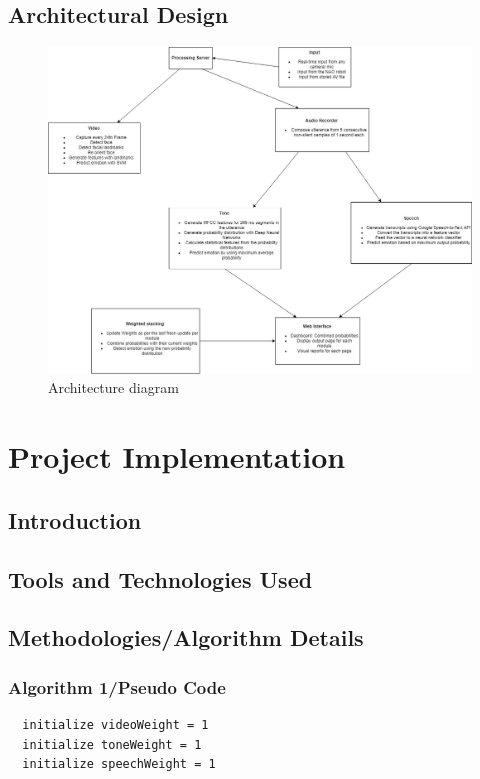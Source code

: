 \documentclass[oneside,a4paper,12pt]{report}
\begin{document}
\begin{normalsize}
\section{Architectural Design}  
 
\begin{center}
	\begin{figure}[!htbp]
		\centering
		\includegraphics[width=\textwidth]{arch.jpg}
	  \caption{Architecture diagram}
	  \label{fig:arch-dig}
	\end{figure}
\end{center} 
 
\chapter{Project Implementation}
  \section{Introduction}
  
  \section{Tools and Technologies Used}
  
  \section{Methodologies/Algorithm Details}

  \subsection{Algorithm 1/Pseudo Code}
  \begin{verbatim}
  initialize videoWeight = 1
  initialize toneWeight = 1
  initialize speechWeight = 1
  

\end{verbatim}
\end{normalsize}
\end{document}
